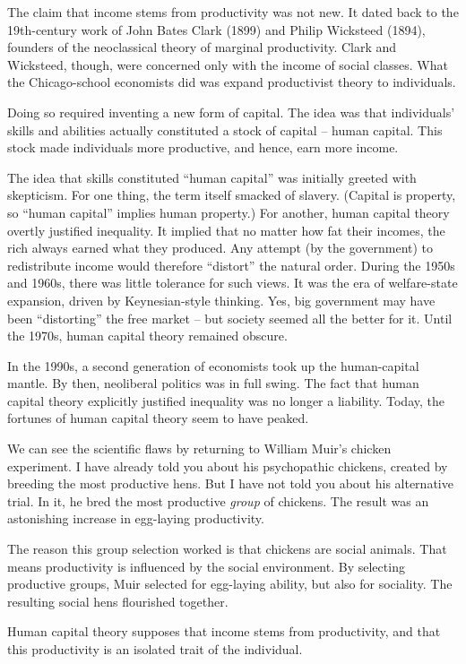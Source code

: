 \documentclass[
]{book}
\begin{document}
The claim that income stems from productivity was not new.
It dated back to the 19th-century work of John Bates Clark (1899) and Philip Wicksteed (1894),
founders of the neoclassical theory of marginal productivity.
Clark and Wicksteed, though, were concerned only with the income of social classes.
What the Chicago-school economists did was expand productivist theory to individuals.

Doing so required inventing a new form of capital.
The idea was that individuals' skills and abilities actually constituted a stock of capital --
human capital. This stock made individuals more productive, and hence, earn more income.

The idea that skills constituted ``human capital'' was initially greeted with skepticism. For one
thing, the term itself smacked of slavery. (Capital is property, so ``human capital'' implies
human property.) For another, human capital theory overtly justified inequality. It implied that
no matter how fat their incomes, the rich always earned what they produced. Any attempt (by
the government) to redistribute income would therefore ``distort'' the natural order. During the
1950s and 1960s, there was little tolerance for such views. It was the era of welfare-state
expansion, driven by Keynesian-style thinking. Yes, big government may have been
``distorting'' the free market -- but society seemed all the better for it.
Until the 1970s, human capital theory remained obscure.

In the 1990s, a second generation of economists took up the human-capital mantle. By then,
neoliberal politics was in full swing. The fact that human capital theory explicitly justified
inequality was no longer a liability.
Today, the fortunes of human capital theory seem to have peaked.

We can see the scientific flaws by returning to William Muir's chicken experiment. I have
already told you about his psychopathic chickens, created by breeding the most productive
hens. But I have not told you about his alternative trial. In it, he bred the most productive
\emph{group} of chickens. The result was an astonishing increase in egg-laying productivity.

The reason this group selection worked is that chickens are social animals. That means
productivity is influenced by the social environment. By selecting productive groups, Muir
selected for egg-laying ability, but also for sociality. The resulting social hens flourished
together.

Human capital theory supposes that income stems from productivity, and that this productivity
is an isolated trait of the individual.
\end{document}
